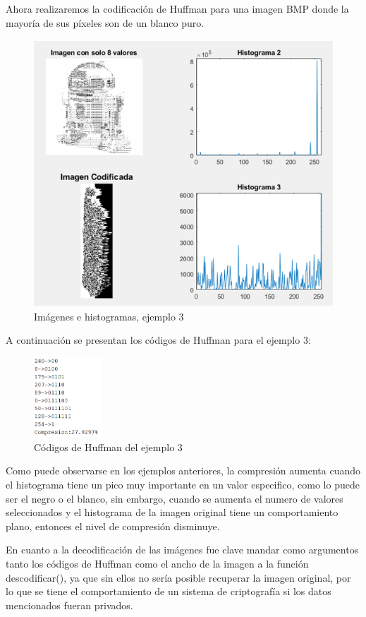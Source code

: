 \documentclass[12pt,twoside]{article}
\begin{document}
    Ahora realizaremos la codificación de Huffman para una imagen BMP donde la mayoría de sus píxeles son de un blanco puro.
    
    \begin{figure}[H]
            \centering
            \includegraphics[height=10cm]{imagenes/a5.png}
            \caption{Imágenes e histogramas, ejemplo 3}
        \end{figure}
    
    A continuación se presentan los códigos de Huffman para el ejemplo 3:
    \begin{figure}[H]
            \centering
            \includegraphics[height=3cm]{imagenes/a6.png}
            \caption{Códigos de Huffman del ejemplo 3}
        \end{figure}
    Como puede observarse en los ejemplos anteriores, la compresión aumenta cuando el histograma tiene un pico muy importante en un valor especifico, como lo puede ser el negro o el blanco, sin embargo, cuando se aumenta el numero de valores seleccionados y el histograma de la imagen original tiene un comportamiento plano, entonces el nivel de compresión disminuye.
    
    En cuanto a la decodificación de las imágenes fue clave mandar como argumentos tanto los códigos de Huffman como el ancho de la imagen  a la función descodificar(), ya que sin ellos no sería posible recuperar la imagen original, por lo que se tiene el comportamiento de un sistema de criptografía si los datos mencionados fueran privados. 
    
\end{document}
